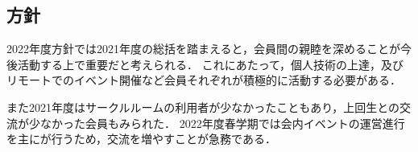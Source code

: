 \subsection*{\newGradeIfKouki{}\secondGrade{}方針}


2022年度\newGradeIfKouki{}\secondGrade{}方針では2021年度の総括を踏まえると，会員間の親睦を深めることが今後活動する上で重要だと考えられる．
これにあたって，個人技術の上達，及びリモートでのイベント開催など会員それぞれが積極的に活動する必要がある．

また2021年度はサークルルームの利用者が少なかったこともあり，上回生との交流が少なかった会員もみられた．
2022年度春学期では会内イベントの運営進行を主に\secondGrade{}が行うため，交流を増やすことが急務である．
